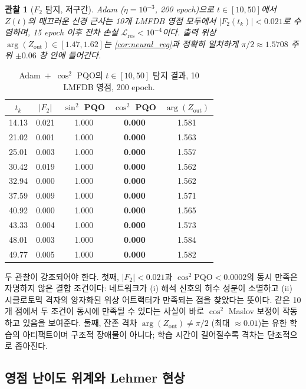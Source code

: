 \documentclass[11pt, a4paper]{article}
\theoremstyle{definition}
\theoremstyle{plain}
\newtheorem{observation}[theorem]{관찰}
\begin{document}
\begin{observation}[$F_2$ 탐지, 저구간]
\label{obs:f2_low}
Adam ($\eta=10^{-3}$, 200 epoch)으로 $t\in[10,50]$에서 $Z(t)$의 매끄러운 신경 근사는 10개 LMFDB 영점 모두에서 $|F_2(t_k)| < 0.021$로 수렴하며, 15 epoch 이후 잔차 손실 $\mathcal{L}_{\mathrm{res}} < 10^{-4}$이다. 출력 위상 $\arg(Z_{\mathrm{out}}) \in [1.47,1.62]$는 \cref{cor:neural_reg}과 정확히 일치하게 $\pi/2\approx 1.5708$ 주위 $\pm 0.06$ 창 안에 들어간다.
\end{observation}

\begin{table}[h]
\centering
\caption{Adam~$+$~$\cos^2$ PQO의 $t\in[10,50]$ 탐지 결과, 10 LMFDB 영점, 200 epoch.}
\label{tab:f2_low}
\begin{tabular}{c|cccc}
\toprule
$t_k$ & $|F_2|$ & $\sin^2$ PQO & $\cos^2$ PQO & $\arg(Z_{\mathrm{out}})$ \\
\midrule
14.13 & 0.021 & 1.000 & \textbf{0.000} & 1.581 \\
21.02 & 0.001 & 1.000 & \textbf{0.000} & 1.563 \\
25.01 & 0.003 & 1.000 & \textbf{0.000} & 1.557 \\
30.42 & 0.019 & 1.000 & \textbf{0.000} & 1.562 \\
32.94 & 0.000 & 1.000 & \textbf{0.000} & 1.562 \\
37.59 & 0.009 & 1.000 & \textbf{0.000} & 1.571 \\
40.92 & 0.000 & 1.000 & \textbf{0.000} & 1.565 \\
43.33 & 0.004 & 1.000 & \textbf{0.000} & 1.573 \\
48.01 & 0.003 & 1.000 & \textbf{0.000} & 1.584 \\
49.77 & 0.005 & 1.000 & \textbf{0.000} & 1.582 \\
\bottomrule
\end{tabular}
\end{table}

두 관찰이 강조되어야 한다. 첫째, $|F_2|<0.021$과 $\cos^2\mathrm{PQO}<0.0002$의 동시 만족은 자명하지 않은 결합 조건이다: 네트워크가 (i) 해석 신호의 허수 성분이 소멸하고 (ii) 시클로토믹 격자의 양자화된 위상 어트랙터가 만족되는 점을 찾았다는 뜻이다. 같은 10개 점에서 두 조건이 동시에 만족될 수 있다는 사실이 바로 $\cos^2$ Maslov 보정이 작동하고 있음을 보여준다. 둘째, 잔존 격차 $\arg(Z_{\mathrm{out}})\neq\pi/2$ (최대 $\approx 0.01$)는 유한 학습의 아티팩트이며 구조적 장애물이 아니다; 학습 시간이 길어질수록 격차는 단조적으로 좁아진다.

\subsection{영점 난이도 위계와 Lehmer 현상}
\label{sec:lehmer}
\end{document}
